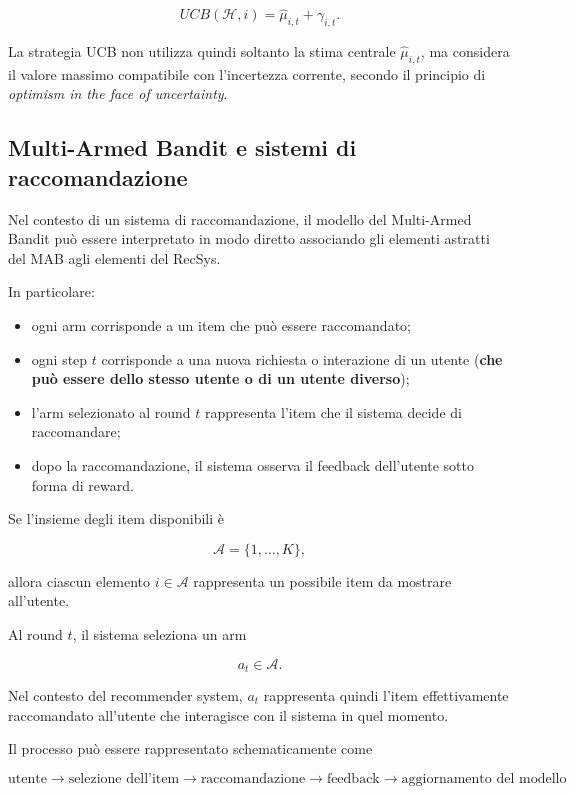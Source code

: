 \[
UCB(\mathcal H,i)
=
\widehat{\mu}_{i,t}
+
\gamma_{i,t}.
\]

La strategia UCB non utilizza quindi soltanto la stima centrale $\widehat{\mu}_{i,t}$, ma considera il valore massimo compatibile con l'incertezza corrente, secondo il principio di \emph{optimism in the face of uncertainty}.


\newpage

\subsection{Multi-Armed Bandit e sistemi di raccomandazione}

Nel contesto di un sistema di raccomandazione, il modello del Multi-Armed Bandit può essere interpretato in modo diretto associando gli elementi astratti del MAB agli elementi del RecSys.

In particolare:
\begin{itemize}
    \item ogni arm corrisponde a un item che può essere raccomandato;
    \item ogni step $t$ corrisponde a una nuova richiesta o interazione di un utente (\textbf{che può essere dello stesso utente o di un utente diverso});
    \item l'arm selezionato al round $t$ rappresenta l'item che il sistema decide di raccomandare;
    \item dopo la raccomandazione, il sistema osserva il feedback dell'utente sotto forma di reward.
\end{itemize}

Se l'insieme degli item disponibili è

\[
\mathcal A=\{1,\ldots,K\},
\]

allora ciascun elemento $i\in\mathcal A$ rappresenta un possibile item da mostrare all'utente.

Al round $t$, il sistema seleziona un arm

\[
a_t\in\mathcal A.
\]

Nel contesto del recommender system, $a_t$ rappresenta quindi l'item effettivamente raccomandato all'utente che interagisce con il sistema in quel momento.

Il processo può essere rappresentato schematicamente come

\[
\boxed{
\text{utente}
\longrightarrow
\text{selezione dell'item}
\longrightarrow
\text{raccomandazione}
\longrightarrow
\text{feedback}
\longrightarrow
\text{aggiornamento del modello}
}
\]

